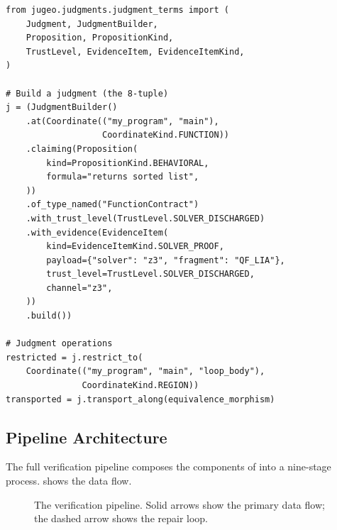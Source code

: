 \begin{lstlisting}[style=jugeo-python,
  caption={Judgment construction via the fluent builder.},
  label={lst:api-judgment}]
from jugeo.judgments.judgment_terms import (
    Judgment, JudgmentBuilder,
    Proposition, PropositionKind,
    TrustLevel, EvidenceItem, EvidenceItemKind,
)

# Build a judgment (the 8-tuple)
j = (JudgmentBuilder()
    .at(Coordinate(("my_program", "main"),
                   CoordinateKind.FUNCTION))
    .claiming(Proposition(
        kind=PropositionKind.BEHAVIORAL,
        formula="returns sorted list",
    ))
    .of_type_named("FunctionContract")
    .with_trust_level(TrustLevel.SOLVER_DISCHARGED)
    .with_evidence(EvidenceItem(
        kind=EvidenceItemKind.SOLVER_PROOF,
        payload={"solver": "z3", "fragment": "QF_LIA"},
        trust_level=TrustLevel.SOLVER_DISCHARGED,
        channel="z3",
    ))
    .build())

# Judgment operations
restricted = j.restrict_to(
    Coordinate(("my_program", "main", "loop_body"),
               CoordinateKind.REGION))
transported = j.transport_along(equivalence_morphism)
\end{lstlisting}

\subsection{Pipeline Architecture}\label{sec:pipeline}

The full verification pipeline composes the components of
 into a nine-stage process.
 shows the data flow.

\begin{figure}[htbp]
\centering
{}
\caption{The \JuGeo{} verification pipeline.  Solid arrows show the
  primary data flow; the dashed arrow shows the repair loop.}
\label{fig:pipeline}
\end{figure}

